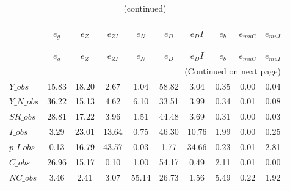  
\begin{center}
\begin{longtable}{lccccccccc} 
\caption{VARIANCE DECOMPOSITION (in percent)}\\
 \label{Table:th_var_decomp_uncond}\\
\toprule 
$               $	 & 	 $        {e_g}$	 & 	 $        {e_Z}$	 & 	 $     {e_{ZI}}$	 & 	 $        {e_N}$	 & 	 $        {e_D}$	 & 	 $       {e_DI}$	 & 	 $        {e_b}$	 & 	 $    {e_{muC}}$	 & 	 $    {e_{muI}}$\\
\midrule \endfirsthead 
\caption{(continued)}\\
 \toprule \\ 
$               $	 & 	 $        {e_g}$	 & 	 $        {e_Z}$	 & 	 $     {e_{ZI}}$	 & 	 $        {e_N}$	 & 	 $        {e_D}$	 & 	 $       {e_DI}$	 & 	 $        {e_b}$	 & 	 $    {e_{muC}}$	 & 	 $    {e_{muI}}$\\
\midrule \endhead 
\midrule \multicolumn{10}{r}{(Continued on next page)} \\ \bottomrule \endfoot 
\bottomrule \endlastfoot 
$Y\_obs         $	 & 	        15.83	 & 	        18.20	 & 	         2.67	 & 	         1.04	 & 	        58.82	 & 	         3.04	 & 	         0.35	 & 	         0.00	 & 	         0.04 \\ 
$Y\_N\_obs      $	 & 	        36.22	 & 	        15.13	 & 	         4.62	 & 	         6.10	 & 	        33.51	 & 	         3.99	 & 	         0.34	 & 	         0.01	 & 	         0.08 \\ 
$SR\_obs        $	 & 	        28.81	 & 	        17.22	 & 	         3.96	 & 	         1.51	 & 	        44.48	 & 	         3.69	 & 	         0.31	 & 	         0.00	 & 	         0.03 \\ 
$I\_obs         $	 & 	         3.29	 & 	        23.01	 & 	        13.64	 & 	         0.75	 & 	        46.30	 & 	        10.76	 & 	         1.99	 & 	         0.00	 & 	         0.25 \\ 
$p\_I\_obs      $	 & 	         0.13	 & 	        16.79	 & 	        43.57	 & 	         0.03	 & 	         1.77	 & 	        34.66	 & 	         0.23	 & 	         0.01	 & 	         2.81 \\ 
$C\_obs         $	 & 	        26.96	 & 	        15.17	 & 	         0.10	 & 	         1.00	 & 	        54.17	 & 	         0.49	 & 	         2.11	 & 	         0.01	 & 	         0.00 \\ 
$NC\_obs        $	 & 	         3.46	 & 	         2.41	 & 	         3.07	 & 	        55.14	 & 	        26.73	 & 	         1.56	 & 	         5.49	 & 	         0.22	 & 	         1.92 \\ 

\end{longtable}
\end{center}
